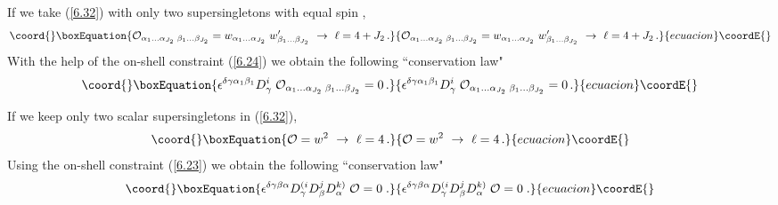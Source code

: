 \documentclass[a4paper,11pt]{article}
\begin{document}
If \coordHE{} we take (\ref{6.32}) with only two supersingletons with equal
spin \coordHE{},
\begin{equation}\coord{}\boxEquation{\label{s4}
  {\cal O}_{\alpha_1\ldots\alpha_{J_2}\; \beta_1\ldots\beta_{J_2}} =
  w_{\alpha_1\ldots\alpha_{J_2}} \; w'_{\beta_1\ldots\beta_{J_2}}
  \ \rightarrow \ \ell = 4 +J_2 \,.
}{{\cal O}_{\alpha_1\ldots\alpha_{J_2}\; \beta_1\ldots\beta_{J_2}} =
  w_{\alpha_1\ldots\alpha_{J_2}} \; w'_{\beta_1\ldots\beta_{J_2}}
  \ \rightarrow \ \ell = 4 +J_2 \,.
}{ecuacion}\coordE{}\end{equation}
With the help of the on-shell constraint (\ref{6.24}) we obtain the following
``conservation law"
\begin{equation}\coord{}\boxEquation{\label{6.3312}
  \epsilon^{\delta\gamma\alpha_1\beta_1} D^i_\gamma\;
  {\cal O}_{\alpha_1\ldots\alpha_{J_2}\; \beta_1\ldots\beta_{J_2}} = 0\,.
}{\epsilon^{\delta\gamma\alpha_1\beta_1} D^i_\gamma\;
  {\cal O}_{\alpha_1\ldots\alpha_{J_2}\; \beta_1\ldots\beta_{J_2}} = 0\,.
}{ecuacion}\coordE{}\end{equation}

If \coordHE{} we keep only two scalar supersingletons in (\ref{6.32}),
\begin{equation}\coord{}\boxEquation{\label{s5}
  {\cal O} = w^2 \ \rightarrow \ \ell = 4 \,.
}{{\cal O} = w^2 \ \rightarrow \ \ell = 4 \,.
}{ecuacion}\coordE{}\end{equation}
Using the on-shell constraint (\ref{6.23}) we obtain the following
``conservation law"
\begin{equation}\coord{}\boxEquation{\label{6.3316}
  \epsilon^{\delta\gamma\beta\alpha}D^{(i}_\gamma D^j_\beta
D^{k)}_\alpha\; {\cal O} = 0\;.
}{\epsilon^{\delta\gamma\beta\alpha}D^{(i}_\gamma D^j_\beta
D^{k)}_\alpha\; {\cal O} = 0\;.
}{ecuacion}\coordE{}\end{equation}
\end{document}
